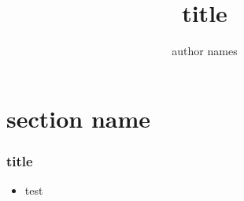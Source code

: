 \documentclass{beamer}
\title{title}
\author{author names}
\begin{document}
\begin{frame}[plain]
\titlepage
\end{frame}



\section{section name}

\begin{frame}
\frametitle{title}
\begin{itemize}
\item test
\end{itemize}
\end{frame}
\end{document}

